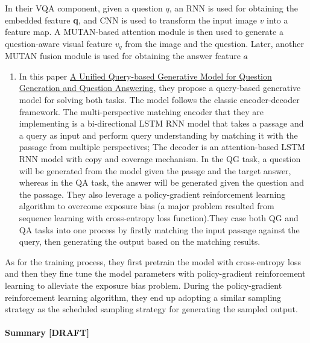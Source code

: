 \documentclass[]{book}
\providecommand{\tightlist}{%
  \setlength{\itemsep}{0pt}\setlength{\parskip}{0pt}}
\let\oldparagraph\paragraph
\renewcommand{\paragraph}[1]{\oldparagraph{#1}\mbox{}}
\theoremstyle{definition}
\theoremstyle{definition}
\theoremstyle{definition}
\theoremstyle{remark}
\begin{document}
In their VQA component, given a question \(q\), an RNN is used for
obtaining the embedded feature \textbf{q}, and CNN is used to transform
the input image \(v\) into a feature map. A MUTAN-based attention module
is then used to generate a question-aware visual feature \(v_q\) from
the image and the question. Later, another MUTAN fusion module is used
for obtaining the answer feature \(a\hat{}\)

\begin{enumerate}
\def\labelenumi{\arabic{enumi}.}
\setcounter{enumi}{3}
\tightlist
\item
  In this paper \href{https://arxiv.org/pdf/1709.01058.pdf}{A Unified
  Query-based Generative Model for Question Generation and Question
  Answering}, they propose a query-based generative model for solving
  both tasks. The model follows the classic encoder-decoder framework.
  The multi-perspective matching encoder that they are implementing is a
  bi-directional LSTM RNN model that takes a passage and a query as
  input and perform query understanding by matching it with the passage
  from multiple perspectives; The decoder is an attention-based LSTM RNN
  model with copy and coverage mechanism. In the QG task, a question
  will be generated from the model given the passge and the target
  answer, whereas in the QA task, the answer will be generated given the
  question and the passage. They also leverage a policy-gradient
  reinforcement learning algorithm to overcome exposure bias (a major
  problem resulted from sequence learning with cross-entropy loss
  function).They case both QG and QA tasks into one process by firstly
  matching the input passage against the query, then generating the
  output based on the matching results.
\end{enumerate}

As for the training process, they first pretrain the model with
cross-entropy loss and then they fine tune the model parameters with
policy-gradient reinforcement learning to alleviate the exposure bias
problem. During the policy-gradient reinforcement learning algorithm,
they end up adopting a similar sampling strategy as the scheduled
sampling strategy for generating the sampled output.

\paragraph{Summary {[}DRAFT{]}}\label{summary-draft}
\end{document}
